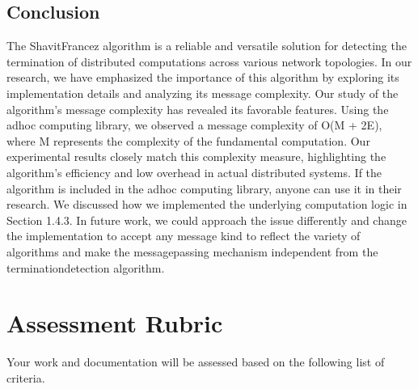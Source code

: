 \documentclass[letterpaper,10pt,english]{sphinxmanual}
\begin{document}
\sphinxstepscope


\section{Conclusion}
\label{\detokenize{docs/ShavitFrancez/conclusion:conclusion}}\label{\detokenize{docs/ShavitFrancez/conclusion::doc}}
\sphinxAtStartPar
The Shavit\sphinxhyphen{}Francez algorithm is a reliable and versatile solution for detecting the termination of distributed computations across various network topologies. In our research, we have emphasized the importance of this algorithm by exploring its implementation details and analyzing its message complexity. Our study of the algorithm’s message complexity has revealed its favorable features. Using the ad\sphinxhyphen{}hoc computing library, we observed a message complexity of O(M + 2E), where M represents the complexity of the fundamental computation. Our experimental results closely match this complexity measure, highlighting the algorithm’s efficiency and low overhead in actual distributed systems. If the algorithm is included in the ad\sphinxhyphen{}hoc computing library, anyone can use it in their research. We discussed how we implemented the underlying computation logic in Section 1.4.3. In future work, we could approach the issue differently and change the implementation to accept any message kind to reflect the variety of algorithms and make the message\sphinxhyphen{}passing mechanism independent from the termination\sphinxhyphen{}detection algorithm.

\sphinxstepscope


\chapter{Assessment Rubric}
\label{\detokenize{docs/rubric:assessment-rubric}}\label{\detokenize{docs/rubric::doc}}
\sphinxAtStartPar
Your work and documentation will be assessed based on the following list of criteria.
\end{document}
